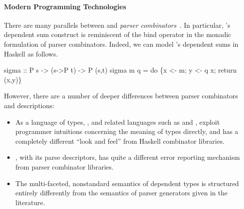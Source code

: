 \paragraph*{Modern Programming Technologies}
There are many parallels between \ddc{} and {\it parser
combinators}~\cite{burge:parser-combinators,hutton+:parser-combinators}. 
In particular, \ddc{}'s dependent sum construct is 
reminiscent of the bind operator in the monadic formulation of parser
combinators.  Indeed, we can model \ddc{}'s dependent sums in Haskell as 
follows.
\begin{code}
\mbox{}
sigma :: P s -> (s->P t) -> P (s,t)
sigma m q = do \{x <- m; y <- q x; return (x,y)\}
\mbox{}
\end{code}%
\noindent
However, there are a number of deeper differences between parser
combinators and \ddc{} descriptions:  

\begin{itemize}
\item As a language of types,
\ddc{}, and related languages such as \padsc{} and \padsml{}, exploit
programmer intuitions concerning the meaning of types directly,
and has a completely different ``look and feel'' from Haskell combinator
libraries.
\item \ddc{}, with its parse descriptors, 
has quite a different error reporting mechanism from
parser combinator libraries.
\item The multi-faceted, nonstandard 
semantics of dependent \ddc{} types is structured
entirely differently from the semantics of parser generators given
in the literature.
\end{itemize}


